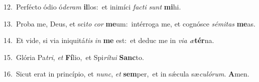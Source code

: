 {\numbfont\textcolor{\numbcolor}{12.}}~Perfécto ódio ó\-\textit{de}\-\textit{ram} \textbf{il}\-los:~\star et inimíci \textit{fac}\-\textit{ti} \textit{sunt} \textbf{mi}\-hi.\par
{\numbfont\textcolor{\numbcolor}{13.}}~Proba me, Deus, et sci\textit{to} \textit{cor} \textbf{me}\-um:~\star intérroga me, et cognósce \textit{sé}\-\textit{mi}\textit{tas} \textbf{me}\-as.\par
{\numbfont\textcolor{\numbcolor}{14.}}~Et vide, si via iniquitá\textit{tis} \textit{in} \textbf{me} est:~\star et deduc me in \textit{vi}\-\textit{a} \textit{æ}\-\textbf{tér}na.\par
{\numbfont\textcolor{\numbcolor}{15.}}~Glória Pa\-\textit{tri}\-, \textit{et} \textbf{Fí}\-lio,~\star et Spi\-\textit{rí}\-\textit{tu}\textit{i} \textbf{Sanc}\-to.\par
{\numbfont\textcolor{\numbcolor}{16.}}~Sicut erat in princípio, et \textit{nunc}\-, \textit{et} \textbf{sem}\-per,~\star et in sǽcula sæ\-\textit{cu}\-\textit{ló}\textit{rum}. \textbf{A}\-men.\par
